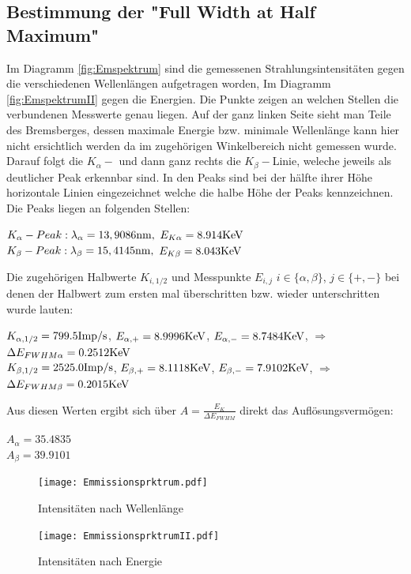 \subsection{Bestimmung der "Full Width at Half Maximum"}
Im Diagramm \autoref{fig:Emspektrum} sind die gemessenen Strahlungsintensitäten gegen die 
verschiedenen Wellenlängen aufgetragen worden, Im Diagramm \autoref{fig:EmspektrumII} gegen die Energien.
Die Punkte zeigen an welchen Stellen die verbundenen Messwerte genau liegen. Auf der ganz linken Seite sieht man Teile des Bremsberges, dessen 
maximale Energie bzw. minimale Wellenlänge kann hier nicht ersichtlich werden da im zugehörigen Winkelbereich nicht 
gemessen wurde. Darauf folgt die $K_\alpha-$ und dann ganz rechts die $K_\beta-$Linie, weleche jeweils als deutlicher
Peak erkennbar sind. In den Peaks sind bei der hälfte ihrer Höhe horizontale Linien eingezeichnet welche die halbe
Höhe der Peaks kennzeichnen. Die Peaks liegen an folgenden Stellen:
\begin{center}
  $K_\alpha -Peak: \lambda_\alpha=13,9086\si[]{nm},$  $E_{K\alpha}=8.914\si[]{KeV}$\\
  $K_\beta -Peak:  \lambda_\beta=15,4145\si[]{nm},$  $E_{K\beta}=8.043\si[]{KeV}$
\end{center} 
Die zugehörigen Halbwerte $K_{i,1/2}$ und Messpunkte $E_{i,j}$ $i\in\{\alpha,\beta\}$, $j\in\{+,-\}$ bei denen 
der Halbwert zum ersten mal überschritten bzw. wieder unterschritten wurde lauten:
\begin{center}
  $K_{\alpha,1/2}=799.5\si[]{Imp/s}$, $E_{\alpha,+}=8.9996\si[]{KeV}$, $E_{\alpha,-}=8.7484\si[]{KeV}$, $\Rightarrow$ $\Delta E_{FWHM\alpha}=0.2512\si[]{KeV}$\\
  $K_{\beta,1/2}=2525.0\si[]{Imp/s}$, $E_{\beta,+}=8.1118\si[]{KeV}$, $E_{\beta,-}=7.9102\si[]{KeV}$, $\Rightarrow$ $\Delta E_{FWHM\beta}=0.2015\si[]{KeV}$
\end{center}
Aus diesen Werten ergibt sich über $A=\frac{E_K}{\Delta E_{FWHM}}$ direkt das Auflösungsvermögen:
\begin{center}
  $A_\alpha=35.4835$\\
  $A_\beta=39.9101$
\end{center}


  \begin{figure}
    \centering
    \texttt{[image: Emmissionsprktrum.pdf]}
    \caption{Intensitäten nach Wellenlänge}
    \label{fig:Emspektrum}
  \end{figure}

  \begin{figure}
    \centering
    \texttt{[image: EmmissionsprktrumII.pdf]}
    \caption{Intensitäten nach Energie}
    \label{fig:EmspektrumII}
  \end{figure}

